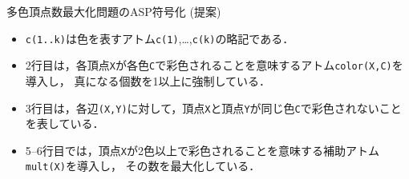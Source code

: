 \documentclass[dvipdfmx,11pt]{beamer}
\newcommand{\code}[1]{\lstinline[basicstyle=\ttfamily]{#1}}
\begin{document}
\begin{frame}{多色頂点数最大化問題のASP符号化 (提案)}

\begin{exampleblock}{}
 
\end{exampleblock}

 \begin{itemize}
  \item \code{c(1..k)}は色を表すアトム\code{c(1)},\ldots,\code{c(k)}の略記である．
  \item 2行目は，各頂点\code{X}が各色\code{C}で彩色されることを意味するアトム\code{color(X,C)}を導入し，
        真になる個数を1以上に強制している．
  \item 3行目は，各辺\code{(X,Y)}に対して，頂点\code{X}と頂点\code{Y}が同じ色\code{C}で彩色されないことを表している．
  \item 5--6行目では，頂点\code{X}が2色以上で彩色されることを意味する補助アトム\code{mult(X)}を導入し，
        その数を最大化している．


 \end{itemize}

\end{frame}

\end{document}
